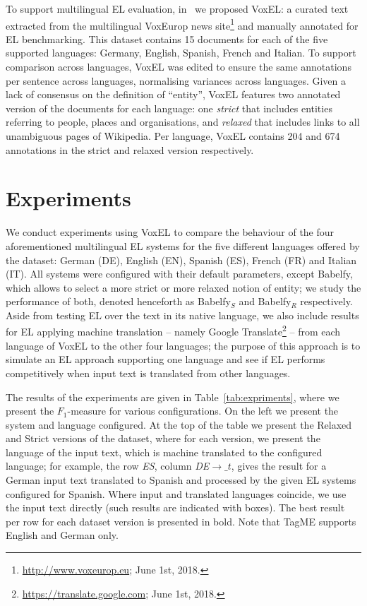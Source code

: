 \documentclass{llncs}
\begin{document}
To support multilingual EL evaluation, in~\cite{ourISWC} we proposed VoxEL: a curated text extracted from the multilingual VoxEurop news site\footnote{\url{http://www.voxeurop.eu}; June 1st, 2018.} and manually annotated for EL benchmarking. This dataset contains 15 documents for each of the five supported languages: Germany, English, Spanish, French and Italian. To support comparison across languages, VoxEL was edited to ensure the same annotations per sentence across languages, normalising variances across languages. Given a lack of consensus on the definition of ``entity'', VoxEL features two annotated version of the documents for each language: one \textit{strict} that includes entities referring to people, places and organisations, and \textit{relaxed} that includes links to all unambiguous pages of Wikipedia. Per language, VoxEL contains 204 and 674 annotations in the strict and relaxed version respectively.

\section{Experiments}

We conduct experiments using VoxEL to compare the behaviour of the four aforementioned multilingual EL systems for the five different languages offered by the dataset: German (DE), English (EN), Spanish (ES), French (FR) and Italian (IT). All systems were configured with their default parameters, except Babelfy, which allows to select a more strict or more relaxed notion of entity; we study the performance of both, denoted henceforth as Babelfy$_S$ and Babelfy$_R$ respectively. Aside from testing EL over the text in its native language, we also include results for EL applying machine translation -- namely Google Translate\footnote{\url{https://translate.google.com}; June 1st, 2018.} -- from each language of VoxEL to the other four languages; the purpose of this approach is to simulate an EL approach supporting one language and see if EL performs competitively when input text is translated from other languages. 

The results of the experiments are given in Table~\ref{tab:expriments}, where we present the $F_1$-measure for various configurations. On the left we present the system and language configured. At the top of the table we present the Relaxed and Strict versions of the dataset, where for each version, we present the language of the input text, which is machine translated to the configured language; for example, the row \textit {ES}, column \textit{DE$\rightarrow{}\_t$}, gives the result for a German input text translated to Spanish and processed by the given EL systems configured for Spanish. Where input and translated languages coincide, we use the input text directly (such results are indicated with boxes). The best result per row for each dataset version is presented in bold. Note that TagME supports English and German only.
\end{document}
